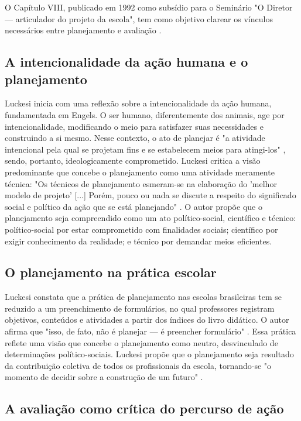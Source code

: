 O Capítulo VIII, publicado em 1992 como subsídio para o Seminário "O Diretor — articulador do projeto da escola", tem como objetivo clarear os vínculos necessários entre planejamento e avaliação \cite{luckesi-avaprend}.

\subsection{A intencionalidade da ação humana e o planejamento}

Luckesi inicia com uma reflexão sobre a intencionalidade da ação humana, fundamentada em Engels. O ser humano, diferentemente dos animais, age por intencionalidade, modificando o meio para satisfazer suas necessidades e construindo a si mesmo. Nesse contexto, o ato de planejar é "a atividade intencional pela qual se projetam fins e se estabelecem meios para atingi-los" \cite{luckesi-avaprend}, sendo, portanto, ideologicamente comprometido. Luckesi critica a visão predominante que concebe o planejamento como uma atividade meramente técnica: "Os técnicos de planejamento esmeram-se na elaboração do 'melhor modelo de projeto' [...] Porém, pouco ou nada se discute a respeito do significado social e político da ação que se está planejando" \cite{luckesi-avaprend}. O autor propõe que o planejamento seja compreendido como um ato político-social, científico e técnico: político-social por estar comprometido com finalidades sociais; científico por exigir conhecimento da realidade; e técnico por demandar meios eficientes.

\subsection{O planejamento na prática escolar}

Luckesi constata que a prática de planejamento nas escolas brasileiras tem se reduzido a um preenchimento de formulários, no qual professores registram objetivos, conteúdos e atividades a partir dos índices do livro didático. O autor afirma que "isso, de fato, não é planejar — é preencher formulário" \cite{luckesi-avaprend}. Essa prática reflete uma visão que concebe o planejamento como neutro, desvinculado de determinações político-sociais. Luckesi propõe que o planejamento seja resultado da contribuição coletiva de todos os profissionais da escola, tornando-se "o momento de decidir sobre a construção de um futuro" \cite{luckesi-avaprend}.

\subsection{A avaliação como crítica do percurso de ação}

